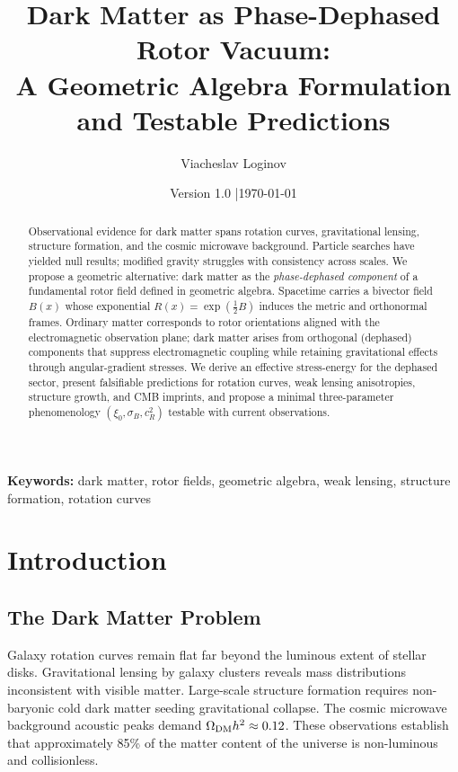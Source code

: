 \documentclass[11pt,a4paper]{article}
\title{\textbf{Dark Matter as Phase-Dephased Rotor Vacuum:\\
A Geometric Algebra Formulation and Testable Predictions}}
\author[1]{Viacheslav Loginov}
\affil[1]{Kyiv, Ukraine\\ \texttt{barthez.slavik@gmail.com}}
\date{\small Version 1.0 \quad|\quad \today}
\numberwithin{equation}{section}
\theoremstyle{plain}
\theoremstyle{definition}
\theoremstyle{remark}
\begin{document}
\maketitle

\begin{abstract}
\noindent
Observational evidence for dark matter spans rotation curves, gravitational lensing, structure formation, and the cosmic microwave background. Particle searches have yielded null results; modified gravity struggles with consistency across scales. We propose a geometric alternative: dark matter as the \emph{phase-dephased component} of a fundamental rotor field defined in geometric algebra. Spacetime carries a bivector field $B(x)$ whose exponential $R(x)=\exp(\tfrac12 B)$ induces the metric and orthonormal frames. Ordinary matter corresponds to rotor orientations aligned with the electromagnetic observation plane; dark matter arises from orthogonal (dephased) components that suppress electromagnetic coupling while retaining gravitational effects through angular-gradient stresses. We derive an effective stress-energy for the dephased sector, present falsifiable predictions for rotation curves, weak lensing anisotropies, structure growth, and CMB imprints, and propose a minimal three-parameter phenomenology $(\xi_0,\sigma_B,c_R^2)$ testable with current observations.
\end{abstract}

\noindent\textbf{Keywords:} dark matter, rotor fields, geometric algebra, weak lensing, structure formation, rotation curves

\vspace{1em}

\section{Introduction}\label{sec:intro}

\subsection{The Dark Matter Problem}

Galaxy rotation curves remain flat far beyond the luminous extent of stellar disks. Gravitational lensing by galaxy clusters reveals mass distributions inconsistent with visible matter. Large-scale structure formation requires non-baryonic cold dark matter seeding gravitational collapse. The cosmic microwave background acoustic peaks demand $\Omega_{\rm DM} h^2 \approx 0.12$. These observations establish that approximately 85\% of the matter content of the universe is non-luminous and collisionless.
\end{document}
